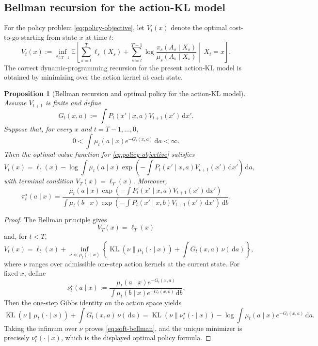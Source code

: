 \documentclass[11pt]{article}
\newcommand{\E}{\mathbb{E}}
\newcommand{\KL}{\operatorname{KL}}
\newcommand{\dd}{\,\mathrm d}
\numberwithin{equation}{section}
\theoremstyle{plain}
\newtheorem{proposition}[theorem]{Proposition}
\theoremstyle{definition}
\theoremstyle{remark}
\begin{document}
\subsection{Bellman recursion for the action-KL model}

For the policy problem \cref{eq:policy-objective}, let $V_t(x)$ denote the optimal cost-to-go starting from state $x$ at time $t$:
\begin{equation}
V_t(x)
:=
\inf_{\pi_{t:T-1}}
\E\!\left[
\sum_{s=t}^{T}\ell_s(X_s)
+
\sum_{s=t}^{T-1}\log\frac{\pi_s(A_s\mid X_s)}{\mu_s(A_s\mid X_s)}
\middle|\,
X_t=x
\right].
\label{eq:policy-value-function}
\end{equation}
The correct dynamic-programming recursion for the present action-KL model is obtained by minimizing over the action kernel at each state.

\begin{proposition}[Bellman recursion and optimal policy for the action-KL model]
\label{prop:soft-bellman}
Assume $V_{t+1}$ is finite and define
\begin{equation}
G_t(x,a)
:=
\int P_t(x'\mid x,a)V_{t+1}(x')\dd x'.
\label{eq:action-cost-to-go}
\end{equation}
Suppose that, for every $x$ and $t=T-1,\dots,0$,
\begin{equation}
0<
\int \mu_t(a\mid x)e^{-G_t(x,a)}\dd a
<\infty.
\label{eq:action-gibbs-normalizer}
\end{equation}
Then the optimal value function for \cref{eq:policy-objective} satisfies
\begin{equation}
V_t(x)
=
\ell_t(x)
-\log
\int \mu_t(a\mid x)
\exp\!\left(-\int P_t(x'\mid x,a)V_{t+1}(x')\dd x'\right)\dd a,
\label{eq:soft-bellman}
\end{equation}
with terminal condition $V_T(x)=\ell_T(x)$. Moreover,
\begin{equation}
\pi_t^\star(a\mid x)
=
\frac{
\mu_t(a\mid x)\exp\!\left(-\int P_t(x'\mid x,a)V_{t+1}(x')\dd x'\right)
}{
\int \mu_t(b\mid x)\exp\!\left(-\int P_t(x'\mid x,b)V_{t+1}(x')\dd x'\right)\dd b
}.
\label{eq:optimal-policy-soft}
\end{equation}
\end{proposition}

\begin{proof}
The Bellman principle gives
\[
V_T(x)=\ell_T(x)
\]
and, for $t<T$,
\[
V_t(x)
=
\ell_t(x)
+
\inf_{\nu\ll\mu_t(\cdot\mid x)}
\left\{
\KL(\nu\|\mu_t(\cdot\mid x))
+
\int G_t(x,a)\,\nu(\dd a)
\right\},
\]
where $\nu$ ranges over admissible one-step action kernels at the current state. For fixed $x$, define
\[
\nu_t^\star(a\mid x)
:=
\frac{\mu_t(a\mid x)e^{-G_t(x,a)}}{\int \mu_t(b\mid x)e^{-G_t(x,b)}\dd b}.
\]
Then the one-step Gibbs identity on the action space yields
\[
\KL(\nu\|\mu_t(\cdot\mid x))
+
\int G_t(x,a)\,\nu(\dd a)
=
\KL(\nu\|\nu_t^\star(\cdot\mid x))
-\log\int \mu_t(a\mid x)e^{-G_t(x,a)}\dd a.
\]
Taking the infimum over $\nu$ proves \cref{eq:soft-bellman}, and the unique minimizer is precisely $\nu_t^\star(\cdot\mid x)$, which is the displayed optimal policy formula.
\end{proof}
\end{document}
